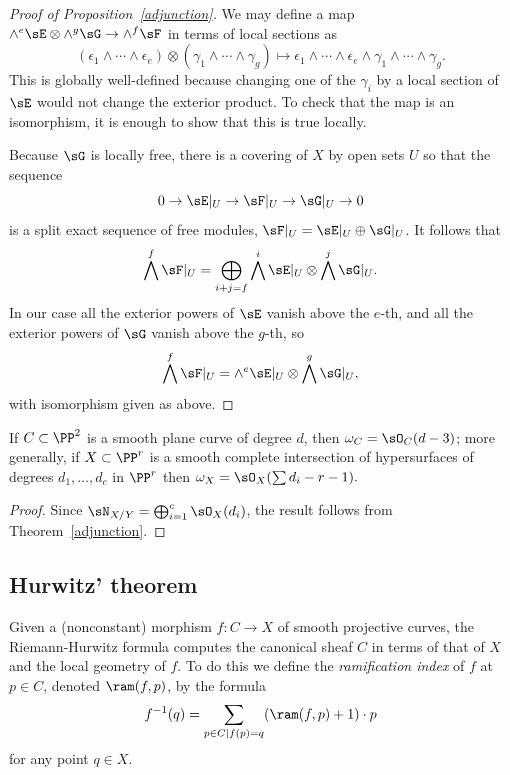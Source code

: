 \begin{proof}[Proof of Proposition~\ref{adjunction}]
 We may define a map
$
\wedge^e\sE \otimes \wedge^g \sG \to \wedge^f\sF
$
in terms of local sections as
$$
(\epsilon_1\wedge\cdots \wedge \epsilon_e) \otimes (\gamma_1\wedge\cdots\wedge \gamma_g)
\mapsto \epsilon_1\wedge\cdots \wedge \epsilon_e\wedge\gamma_1\wedge\cdots\wedge \gamma_g.
$$
This is globally well-defined because changing one of the $\gamma_i$ by a local section of $\sE$ would not
change the exterior product.
To check that the map is an isomorphism, it is enough to show that this is true locally.

Because $\sG$ is locally free, there is a covering of $X$ by open sets $U$
so that the sequence
$$
0\to \sE|_U \to \sF|_U\to \sG|_U \to 0
$$
is a split exact sequence of free modules, $\sF|_U = \sE|_U\oplus \sG|_U$.
It follows that
$$
\bigwedge^f\sF|_U = \bigoplus_{i+j = f} \bigwedge^i \sE|_U \otimes \bigwedge^j\sG|_U.
$$
In our case all the exterior powers of $\sE$ vanish above the $e$-th, and all the 
exterior powers of $\sG$ vanish above the $g$-th, so 
$$
\bigwedge^f\sF|_U =  \wedge^e \sE|_U \otimes \bigwedge^g\sG|_U,
$$
with isomorphism given as above.
\end{proof}


\begin{corollary}\label{canonical of plane curve}\label{canonical of complete intersection}
If $C\subset \PP^{2}$ is a smooth plane curve of degree $d$, then $\omega_{C} = \sO_{C}(d-3)$; more generally, if
$X\subset \PP^{r}$ is a smooth complete intersection of hypersurfaces of degrees $d_{1},\dots, d_{c}$ in $\PP^r$ then
$\omega_{X} = \sO_{X}(\sum d_{i }-r-1).$
\end{corollary}

\begin{proof}
Since $\sN_{X/Y} = \bigoplus_{i=1}^{c} \sO_{X}(d_{i})$, the result follows from Theorem~\ref{adjunction}.
\end{proof}

\subsection{Hurwitz' theorem}
 Given a (nonconstant) morphism $f : C \to X$ of smooth projective curves, the Riemann-Hurwitz formula computes the canonical sheaf  $C$ in terms of that of  $X$ and the local geometry of $f$. To do this we define the
\emph{ramification index} of $f$ at $p \in C$,  denoted $\ram(f,p)$, 
by the formula 
$$
 f^{-1}(q) = \sum_{p\in C \mid f(p)=q} (\ram(f,p)+1)\cdot p
 $$
 for any point $q \in X$. 

